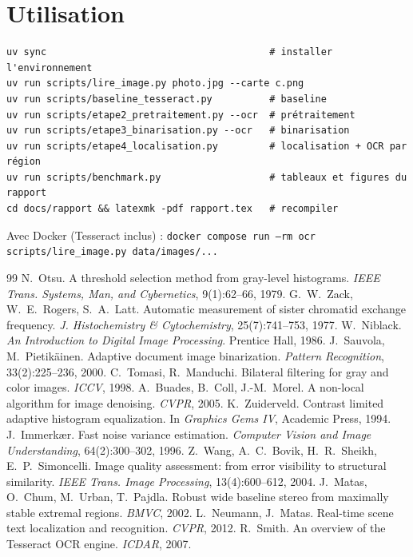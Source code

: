 \documentclass[11pt,a4paper]{article}
\begin{document}
\section{Utilisation}
\begin{verbatim}
uv sync                                       # installer l'environnement
uv run scripts/lire_image.py photo.jpg --carte c.png
uv run scripts/baseline_tesseract.py          # baseline
uv run scripts/etape2_pretraitement.py --ocr  # prétraitement
uv run scripts/etape3_binarisation.py --ocr   # binarisation
uv run scripts/etape4_localisation.py         # localisation + OCR par région
uv run scripts/benchmark.py                   # tableaux et figures du rapport
cd docs/rapport && latexmk -pdf rapport.tex   # recompiler
\end{verbatim}
Avec Docker (Tesseract inclus) : \texttt{docker compose run --rm ocr scripts/lire\_image.py data/images/...}

\begin{thebibliography}{99}
\small
{} N.~Otsu. A threshold selection method from gray-level histograms. \emph{IEEE Trans. Systems, Man, and Cybernetics}, 9(1):62--66, 1979.
 G.~W.~Zack, W.~E.~Rogers, S.~A.~Latt. Automatic measurement of sister chromatid exchange frequency. \emph{J. Histochemistry \& Cytochemistry}, 25(7):741--753, 1977.
 W.~Niblack. \emph{An Introduction to Digital Image Processing}. Prentice Hall, 1986.
 J.~Sauvola, M.~Pietikäinen. Adaptive document image binarization. \emph{Pattern Recognition}, 33(2):225--236, 2000.
 C.~Tomasi, R.~Manduchi. Bilateral filtering for gray and color images. \emph{ICCV}, 1998.
 A.~Buades, B.~Coll, J.-M.~Morel. A non-local algorithm for image denoising. \emph{CVPR}, 2005.
 K.~Zuiderveld. Contrast limited adaptive histogram equalization. In \emph{Graphics Gems IV}, Academic Press, 1994.
 J.~Immerkær. Fast noise variance estimation. \emph{Computer Vision and Image Understanding}, 64(2):300--302, 1996.
 Z.~Wang, A.~C.~Bovik, H.~R.~Sheikh, E.~P.~Simoncelli. Image quality assessment: from error visibility to structural similarity. \emph{IEEE Trans. Image Processing}, 13(4):600--612, 2004.
 J.~Matas, O.~Chum, M.~Urban, T.~Pajdla. Robust wide baseline stereo from maximally stable extremal regions. \emph{BMVC}, 2002.
 L.~Neumann, J.~Matas. Real-time scene text localization and recognition. \emph{CVPR}, 2012.
 R.~Smith. An overview of the Tesseract OCR engine. \emph{ICDAR}, 2007.
\end{thebibliography}
\end{document}
